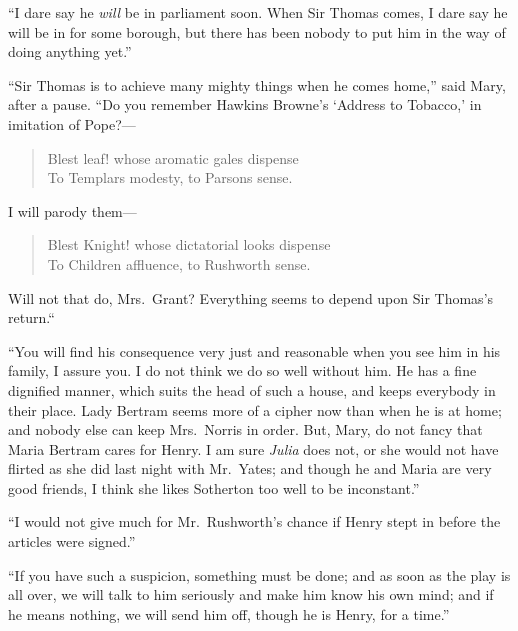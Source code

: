 \documentclass{article}
\begin{document}
``I dare say he \emph{will} be in parliament soon.  When Sir
Thomas comes, I dare say he will be in for some borough,
but there has been nobody to put him in the way of doing
anything yet.''

``Sir Thomas is to achieve many mighty things when he
comes home,'' said Mary, after a pause.  ``Do you remember
Hawkins Browne's `Address to Tobacco,' in imitation
of Pope?---%

\begin{verse}
     Blest leaf! whose aromatic gales dispense\\
     To Templars modesty, to Parsons sense.
\end{verse}

I will parody them---%

\begin{verse}
     Blest Knight! whose dictatorial looks dispense\\
     To Children affluence, to Rushworth sense.
\end{verse}

Will not that do, Mrs.\ Grant?  Everything seems to depend
upon Sir Thomas's return.``

``You will find his consequence very just and reasonable
when you see him in his family, I assure you.  I do not think
we do so well without him.  He has a fine dignified manner,
which suits the head of such a house, and keeps everybody
in their place.  Lady Bertram seems more of a cipher
now than when he is at home; and nobody else can keep
Mrs.\ Norris in order.  But, Mary, do not fancy that Maria
Bertram cares for Henry.  I am sure \emph{Julia} does not,
or she would not have flirted as she did last night with
Mr.\ Yates; and though he and Maria are very good friends,
I think she likes Sotherton too well to be inconstant.''

``I would not give much for Mr.\ Rushworth's chance if Henry
stept in before the articles were signed.''

``If you have such a suspicion, something must be done;
and as soon as the play is all over, we will talk to him
seriously and make him know his own mind; and if he
means nothing, we will send him off, though he is Henry,
for a time.''
\end{document}
